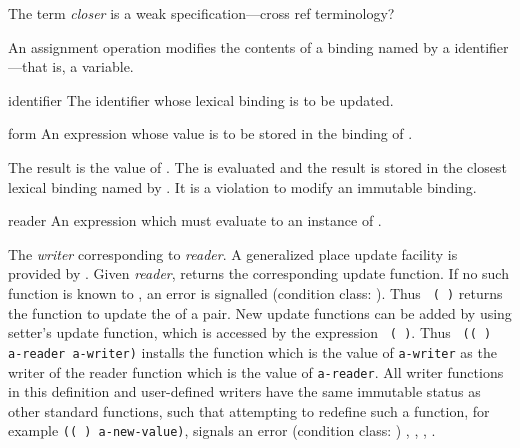 %
\begin{optPrivate}
    The term {\em closer} is a weak specification---cross ref terminology?
\end{optPrivate}
%
\begin{optDefinition}
\noindent
An assignment operation modifies the contents of a
binding named by a identifier---that is, a variable.

%
\Syntax
{}%
%
\begin{arguments}
    \item[identifier] The identifier whose lexical binding is to be updated.

    \item[form] An expression whose value is to be stored in the binding of
    .
\end{arguments}
%
\result%
The result is the value of .
%
\remarks%
The  is evaluated and the result is stored in the closest lexical
binding named by .  It is a violation to modify an immutable
binding.

%
\begin{arguments}
    \item[reader] An expression which must evaluate to an instance of
    .
\end{arguments}
%
\result%
The {\em writer\/} corresponding to {\em reader}.
%
\remarks%
A generalized place update facility is provided by .  Given
{\em reader},  returns the
corresponding update function.  If no such
function is known to , an error is signalled (condition
class: ).  Thus {\tt
    ( )} returns the function to update the
 of a pair.  New update functions can be added by using
{setter}'s update function, which is accessed by the expression {\tt
    ( )}.  Thus {\tt
    (( ) a-reader a-writer)} installs
the function which is the value of {\tt a-writer} as the writer of the reader
function which is the value of {\tt a-reader}.  All writer functions in this
definition and user-defined writers have the same immutable status as other
standard functions, such that attempting to redefine such a function, for
example {\tt (( ) 
    a-new-value)}, signals an error (condition class:
)
%
\seealso%
, , ,
.


\end{optDefinition}
